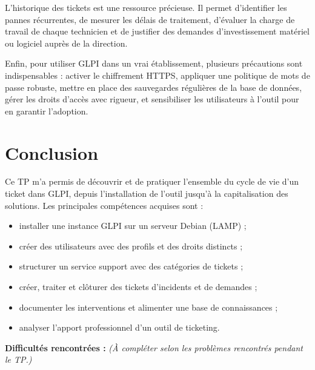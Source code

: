 \documentclass[a4paper,11pt]{article}
\begin{document}
L'historique des tickets est une ressource précieuse. Il permet d'identifier les pannes récurrentes, de mesurer les délais de traitement, d'évaluer la charge de travail de chaque technicien et de justifier des demandes d'investissement matériel ou logiciel auprès de la direction.

Enfin, pour utiliser GLPI dans un vrai établissement, plusieurs précautions sont indispensables : activer le chiffrement HTTPS, appliquer une politique de mots de passe robuste, mettre en place des sauvegardes régulières de la base de données, gérer les droits d'accès avec rigueur, et sensibiliser les utilisateurs à l'outil pour en garantir l'adoption.

\newpage

\section{Conclusion}

Ce TP m'a permis de découvrir et de pratiquer l'ensemble du cycle de vie d'un ticket dans GLPI, depuis l'installation de l'outil jusqu'à la capitalisation des solutions. Les principales compétences acquises sont :

\begin{itemize}
    \item installer une instance GLPI sur un serveur Debian (LAMP) ;
    \item créer des utilisateurs avec des profils et des droits distincts ;
    \item structurer un service support avec des catégories de tickets ;
    \item créer, traiter et clôturer des tickets d'incidents et de demandes ;
    \item documenter les interventions et alimenter une base de connaissances ;
    \item analyser l'apport professionnel d'un outil de ticketing.
\end{itemize}

\textbf{Difficultés rencontrées :} \textit{(À compléter selon les problèmes rencontrés pendant le TP.)}
\end{document}
